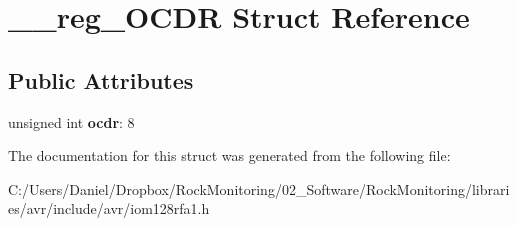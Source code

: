 \hypertarget{struct____reg___o_c_d_r}{}\section{\+\_\+\+\_\+reg\+\_\+\+O\+C\+DR Struct Reference}
\label{struct____reg___o_c_d_r}
\subsection*{Public Attributes}
\begin{DoxyCompactItemize}
\item 
unsigned int {\bfseries ocdr}\+: 8\hypertarget{struct____reg___o_c_d_r_a14d7c291f611b3580595ca45ed61d7fd}{}\label{struct____reg___o_c_d_r_a14d7c291f611b3580595ca45ed61d7fd}

\end{DoxyCompactItemize}


The documentation for this struct was generated from the following file\+:\begin{DoxyCompactItemize}
\item 
C\+:/\+Users/\+Daniel/\+Dropbox/\+Rock\+Monitoring/02\+\_\+\+Software/\+Rock\+Monitoring/libraries/avr/include/avr/iom128rfa1.\+h\end{DoxyCompactItemize}

